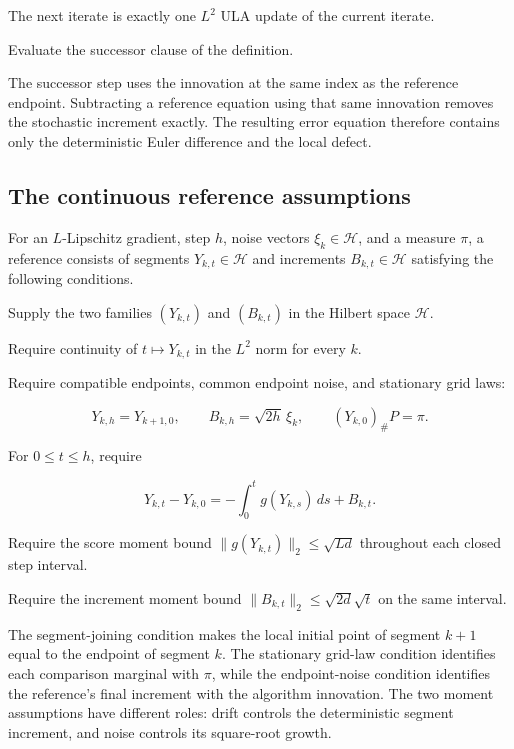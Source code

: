 \documentclass[11pt,a4paper]{report}
\begin{document}
The next iterate is exactly one \(L^2\) ULA update of the current iterate.



Evaluate the successor clause of the definition.



The successor step uses the innovation at the same index as the reference endpoint. Subtracting a reference equation using that same innovation removes the stochastic increment exactly. The resulting error equation therefore contains only the deterministic Euler difference and the local defect.

\subsection{\texorpdfstring{The continuous reference assumptions}{The continuous reference assumptions}}
\label{report-step-UnadjustedLangevin-HilbertDalalyan-lean-3}


For an \(L\)-Lipschitz gradient, step \(h\), noise vectors \(\xi_k\in\mathcal H\), and a measure \(\pi\), a reference consists of segments \(Y_{k,t}\in\mathcal H\) and increments \(B_{k,t}\in\mathcal H\) satisfying the following conditions.



Supply the two families \((Y_{k,t})\) and \((B_{k,t})\) in the Hilbert space \(\mathcal H\).



Require continuity of \(t\mapsto Y_{k,t}\) in the \(L^2\) norm for every \(k\).



Require compatible endpoints, common endpoint noise, and stationary grid laws:

\[Y_{k,h}=Y_{k+1,0},\qquad B_{k,h}=\sqrt{2h}\,\xi_k,\qquad(Y_{k,0})_\#P=\pi.\]

For \(0\le t\le h\), require

\[Y_{k,t}-Y_{k,0}=-\int_0^t g(Y_{k,s})\,ds+B_{k,t}.\]

Require the score moment bound \(\|g(Y_{k,t})\|_2\le\sqrt{Ld}\) throughout each closed step interval.



Require the increment moment bound \(\|B_{k,t}\|_2\le\sqrt{2d}\sqrt t\) on the same interval.



The segment-joining condition makes the local initial point of segment \(k+1\) equal to the endpoint of segment \(k\). The stationary grid-law condition identifies each comparison marginal with \(\pi\), while the endpoint-noise condition identifies the reference's final increment with the algorithm innovation. The two moment assumptions have different roles: drift controls the deterministic segment increment, and noise controls its square-root growth.
\end{document}
